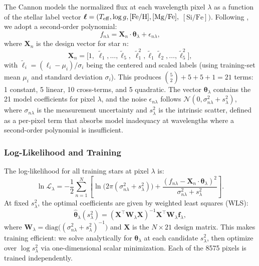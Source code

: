 \documentclass[10pt,preprint2]{aastex}
\begin{document}
The Cannon \citep{Ness2015} models the normalized flux at each wavelength pixel $\lambda$ as a function of the stellar label vector $\boldsymbol{\ell} = (T_{\rm eff}, \log g, [\mathrm{Fe/H}], [\mathrm{Mg/Fe}],$ $[\mathrm{Si/Fe}])$. Following \citet{Ness2015}, we adopt a second-order polynomial:
\begin{equation}
  f_{n\lambda} = \mathbf{X}_n \cdot \boldsymbol{\theta}_\lambda + \epsilon_{n\lambda},
  \label{eq:cannon_model}
\end{equation}
where $\mathbf{X}_n$ is the design vector for star $n$:
\begin{equation}
  \mathbf{X}_n = \bigl[1,\; \tilde{\ell}_1, \ldots, \tilde{\ell}_5,\; \tilde{\ell}_1^2, \tilde{\ell}_1\tilde{\ell}_2, \ldots, \tilde{\ell}_5^2\bigr],
  \label{eq:design_vector}
\end{equation}
with $\tilde{\ell}_i = (\ell_i - \mu_i)/\sigma_i$ being the centered and scaled labels (using training-set mean $\mu_i$ and standard deviation $\sigma_i$). This produces $\binom{5}{2} + 5 + 5 + 1 = 21$ terms: 1 constant, 5 linear, 10 cross-terms, and 5 quadratic. The vector $\boldsymbol{\theta}_\lambda$ contains the 21 model coefficients for pixel $\lambda$, and the noise $\epsilon_{n\lambda}$ follows $\mathcal{N}(0, \sigma_{n\lambda}^2 + s_\lambda^2)$, where $\sigma_{n\lambda}$ is the measurement uncertainty and $s_\lambda^2$ is the intrinsic scatter, defined as a per-pixel term that absorbs model inadequacy at wavelengths where a second-order polynomial is insufficient.

\subsubsection{Log-Likelihood and Training}

The log-likelihood for all training stars at pixel $\lambda$ is:
\begin{equation}
  \ln \mathcal{L}_\lambda = -\frac{1}{2}\sum_{n=1}^{N} \left[ \ln\bigl(2\pi(\sigma_{n\lambda}^2 + s_\lambda^2)\bigr) + \frac{(f_{n\lambda} - \mathbf{X}_n \cdot \boldsymbol{\theta}_\lambda)^2}{\sigma_{n\lambda}^2 + s_\lambda^2} \right].
  \label{eq:cannon_loglike}
\end{equation}
At fixed $s_\lambda^2$, the optimal coefficients are given by weighted least squares (WLS):
\begin{equation}
  \hat{\boldsymbol{\theta}}_\lambda(s_\lambda^2) = \left(\mathbf{X}^\top \mathbf{W}_\lambda \mathbf{X}\right)^{-1} \mathbf{X}^\top \mathbf{W}_\lambda \mathbf{f}_\lambda,
  \label{eq:wls}
\end{equation}
where $\mathbf{W}_\lambda = \mathrm{diag}\bigl((\sigma_{n\lambda}^2 + s_\lambda^2)^{-1}\bigr)$ and $\mathbf{X}$ is the $N \times 21$ design matrix. This makes training efficient: we solve analytically for $\boldsymbol{\theta}_\lambda$ at each candidate $s_\lambda^2$, then optimize over $\log s_\lambda^2$ via one-dimensional scalar minimization. Each of the 8575 pixels is trained independently.
\end{document}
